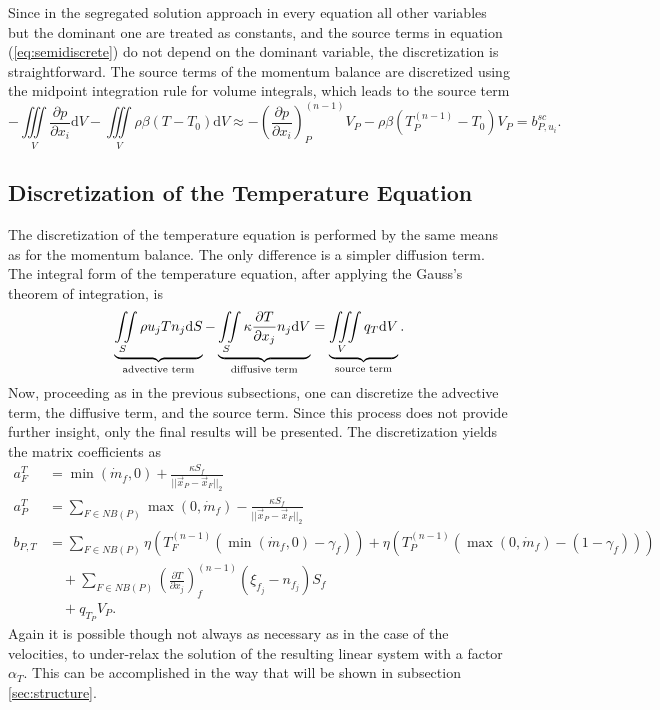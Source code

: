 Since in the segregated solution approach in every equation all other variables but the dominant one are treated as constants, and the source terms in equation (\ref{eq:semidiscrete}) do not depend on the dominant variable, the discretization is straightforward. The source terms of the momentum balance are discretized using the midpoint integration rule for volume integrals, which leads to the source term
\begin{displaymath}
  - \iiint\limits_V \frac{\partial p}{\partial x_i} \mathrm{d}V
  - \iiint\limits_V \rho \beta \left(T - T_0\right) \mathrm{d}V
  \approx
  - \left(\frac{\partial p}{\partial x_i}\right)_P^{(n-1)} V_P
  - \rho \beta \left(T_P^{(n-1)} - T_0\right) V_P
  = b_{P,u_i}^{sc}.
\end{displaymath}

\subsection{Discretization of the Temperature Equation}
\label{sec:discretetemperature}

The discretization of the temperature equation is performed by the same means as for the momentum balance. The only difference is a simpler diffusion term. The integral form of the temperature equation, after applying the Gauss's theorem of integration, is
\begin{displaymath}
  \underbrace{ \iint\limits_S \rho u_j T n_j \mathrm{d}S }_{\text{advective term}}
  - \underbrace{ \iint\limits_S \kappa \frac{\partial T}{\partial x_j} n_j \mathrm{d}V }_{\text{diffusive term}}
  = \underbrace{\iiint\limits_V \vphantom{\frac{ T}{ x_j} } q_T \mathrm{d}V }_{\text{source term}}.
\end{displaymath}
Now, proceeding as in the previous subsections, one can discretize the advective term, the diffusive term, and the source term. Since this process does not provide further insight, only the final results will be presented. The discretization yields the matrix coefficients as
  \begin{align*}
    a_F^{T} &= \min(\dot{m}_f,0) + \frac{\kappa S_f}{||\vec{x}_P - \vec{x}_F||_2} \\[1em]
    a_P^{T} &= \sum_{F \in NB(P)}\max(0,\dot{m}_f) - \frac{\kappa S_f}{||\vec{x}_P - \vec{x}_F||_2} \\[1em]
    b_{P,T} &= \sum_{F \in NB(P)} \eta  \left(T_F^{(n-1)} \left( \min(\dot{m}_f,0) - \gamma_f \right)\right) 
             + \eta \left( T_{P}^{(n-1)} \left( \max(0,\dot{m}_f) - \left(1 - \gamma_f\right) \right)\right) \nonumber \\[0.5em]
            &\quad + \sum_{F \in NB(P)} \left( \frac{\partial T}{\partial x_j}\right)_f^{(n-1)} \left(\xi_{f_j} - n_{f_j}\right)S_f \nonumber \\[0.5em]
            &\quad + q_{T_P} V_P.
  \end{align*}
Again it is possible though not always as necessary as in the case of the velocities, to under-relax the solution of the resulting linear system with a factor \(\alpha_T\). This can be accomplished in the way that will be shown in subsection \ref{sec:structure}.

